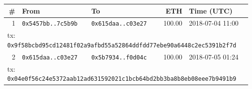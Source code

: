 {\scriptsize\begin{longtable}{r p{2.9cm} p{2.9cm} r p{2.5cm}}\toprule
\textbf{\#} & \textbf{From} & \textbf{To} & \textbf{ETH} & \textbf{Time (UTC)}\\\midrule\endhead
1 & \texttt{0x5457bb..7c5b9b} & \texttt{0x615daa..c03e27} & 100.00 & 2018-07-04 11:00\\
\multicolumn{5}{l}{\quad tx: \texttt{0x9f58bcbd95cd12481f02a9afbd55a52864ddfdd77ebe90a6448c2ec5391b2f7d}}\\
2 & \texttt{0x615daa..c03e27} & \texttt{0x5b7934..f0d04c} & 100.00 & 2018-07-05 01:24\\
\multicolumn{5}{l}{\quad tx: \texttt{0x04e0f56c24e5372aab12ad631592021c1bcb64bd2bb3ba8b8eb08eee7b9491b9}}\\
\bottomrule\end{longtable}}
